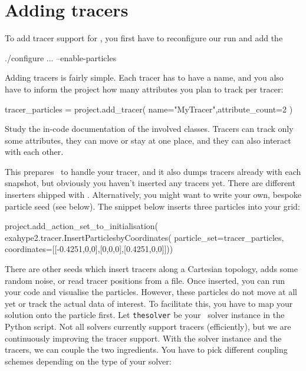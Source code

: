 \section{Adding tracers}

To add tracer support for \ExaHyPE, you first have to reconfigure our run and
add the 
\begin{code}
./configure ... --enable-particles
\end{code}

\noindent
Adding tracers is fairly simple.
Each tracer has to have a name, and you also have to inform the project how many
attributes you plan to track per tracer:

\begin{code}
tracer_particles = project.add_tracer( name="MyTracer",attribute_count=2 )
\end{code} 


\begin{remark}
 Study the in-code documentation of the involved classes. 
 Tracers can track only some attributes, they can move or stay at one place,
 and they can also interact with each other. 
\end{remark}


\noindent
This prepares \ExaHyPE\ to handle your tracer, and it also dumps tracers already
with each snapshot, but obviously you haven't inserted any tracers yet. 
There are different inserters shipped with \ExaHyPE. 
Alternatively, you might want to write your own, bespoke particle seed (see
below).
The snippet below inserts three particles into your grid:


\begin{code}
project.add_action_set_to_initialisation( 
  exahype2.tracer.InsertParticlesbyCoordinates( 
    particle_set=tracer_particles, coordinates=[[-0.4251,0,0],[0,0,0],[0.4251,0,0]]))
\end{code}

\noindent
There are other seeds which insert tracers along a Cartesian
topology, adds some random noise, or read tracer positions from a file.
Once inserted, you can run your
code and visualise the particles.
However, these particles do not move at all yet or track the actual data of
interest.
To facilitate this, you have to map your solution onto the particle first.
Let \texttt{thesolver} be your \ExaHyPE\ solver instance in the Python script.
Not all solvers currently support tracers (efficiently), but we are continuously
improving the tracer support.
With the solver instance and the tracers, we can couple the two ingredients.
You have to pick different coupling schemes depending on the type of your
solver:

